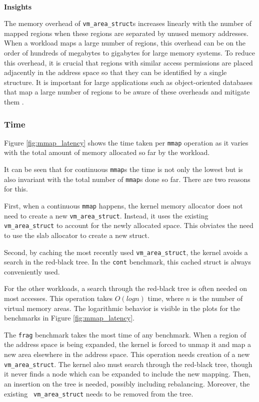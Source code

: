 \documentclass[twocolumn,11pt]{article}
\begin{document}
~\\ \textbf{Insights}

The memory overhead of \texttt{vm\_area\_struct}s increases linearly with the
number of mapped regions when these regions are separated by unused memory
addresses. When a workload maps a large number of regions, this overhead can be
on the order of hundreds of megabytes to gigabytes for large memory systems.  To
reduce this overhead, it is crucial that regions with similar access permissions
are placed adjacently in the address space so that they can be identified by a
single structure. It is important for large applications such as object-oriented
databases that map a large number of regions to be aware of these overheads and mitigate them \cite{utlk}.

\subsubsection{Time}

Figure \ref{fig:mmap_latency} shows the time taken
per \texttt{mmap} operation as it varies with the total amount of memory allocated
so far by the workload. 

It can be seen that for continuous \texttt{mmap}s the time is not only the
lowest but is also invariant with the total number of \texttt{mmap}s done so
far. There are two reasons for this. 

First, when a continuous \texttt{mmap} happens, the
kernel memory allocator does not need to create a new \texttt{vm\_area\_struct}.
Instead, it uses the existing \texttt{vm\_area\_struct} to account for the
newly allocated space. This obviates the need to use the slab allocator to create
a new struct. 

Second, by caching the
most recently used \texttt{vm\_area\_struct}, the kernel avoids a search in the
red-black tree. In the \texttt{cont} benchmark, this cached struct is always
conveniently used.

For the other workloads, a search through the red-black tree is often needed on
most accesses. This operation takes $O(log n)$ time, where $n$ is the number of
virtual memory areas. The logarithmic behavior is visible in the plots for the
benchmarks in Figure \ref{fig:mmap_latency}.

The \texttt{frag} benchmark takes the most time of any benchmark. When a region of the
address space is being expanded, the kernel is forced to unmap it and map a new
area elsewhere in the address space. This operation needs creation of a new
\texttt{vm\_area\_struct}.  The kernel also must search through the red-black
tree, though it never finds a node which can be expanded to include the new
mapping. Then, an insertion on the tree is needed, possibly including
rebalancing. Moreover, the existing \texttt{ vm\_area\_struct} needs to be
removed from the tree. 
\end{document}
